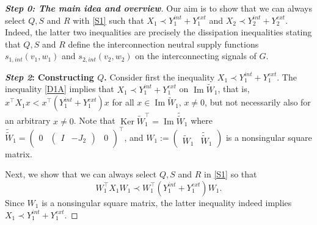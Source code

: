 \documentclass[11pt,a4paper,oneside,DIV=12,headings=small]{scrartcl}
\newcommand{\image}{\operatorname{Im}}
\newcommand{\kernel}{\operatorname{Ker}}
\theoremstyle{plain}
\begin{document}
\begin{proof}[\textbf{Step 0: \textit{The main idea and overview}}]
Our aim is to show that we can always select $Q, S$ and $R$ with \eqref{S1} such that $X_1 \prec Y_1^{int}+Y_1^{ext}$ and $X_2 \prec Y_2^{int}+Y_2^{ext}$. Indeed, the latter two inequalities are precisely the dissipation inequalities stating that  $Q, S$ and $R$ define the interconnection neutral supply functions $s_{1,int}(v_1,w_1)$ and $s_{2,int}(v_2,w_2)$ on the interconnecting signals of $G$.

\medskip

\textbf{\emph{Step 2}: Constructing $Q$.} \newline
Consider first the inequality $X_1 \prec Y_1^{int}+Y_1^{ext}$. The inequality \eqref{D1A} implies that $X_1 \prec Y_1^{int}+Y_1^{ext}$ on $\image \tilde{W}_1$, that is, $x^\top X_1 x < x^\top (Y_1^{int}+Y_1^{ext}) x$ for all $x \in \image \tilde{W}_1$, $x \neq 0$, but not necessarily also for an arbitrary $x\neq 0$. Note that  
$\kernel \tilde{W}_1^\top = \image \tilde{\tilde{W}}_1$ where 
$\tilde{\tilde{W}}_1=\left(\begin{smallmatrix} 0 & \left(\begin{smallmatrix} I & -J_2 \end{smallmatrix}\right) & 0 \end{smallmatrix}\right)^\top$, and
$W_1:=\left(\begin{smallmatrix} \tilde{W}_1 & \tilde{\tilde{W}}_1 \end{smallmatrix}\right)$ is a nonsingular square matrix.

Next, we show that we can always select $Q, S$ and $R$ in \eqref{S1} so that 
\begin{equation}
\label{DesiredInequality1}
W_1^\top X_1 W_1 \prec W_1^\top (Y_1^{int}+Y_1^{ext}) W_1.
\end{equation} 
Since $W_1$ is a nonsingular square matrix, the latter inequality indeed implies $X_1 \prec Y_1^{int}+Y_1^{ext}$.


\end{proof}
\end{document}
